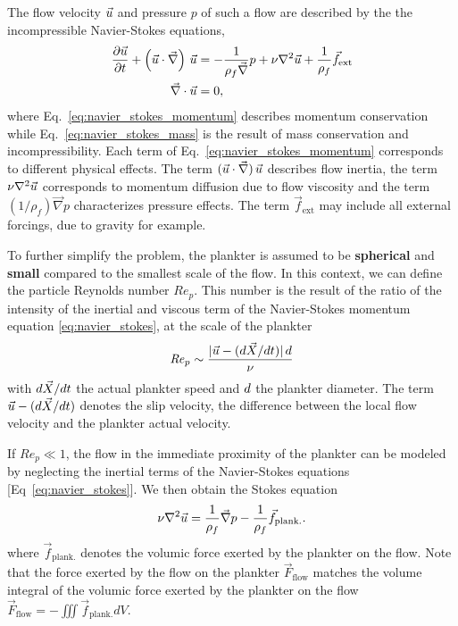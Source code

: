 The flow velocity $\vec{u}$ and pressure $p$ of such a flow are described by the the incompressible Navier-Stokes equations,
\begin{subequations}\label{eq:navier_stokes}
	\begin{align}
		\frac{\partial \vec{u}}{\partial t} + \left( \vec{u} \cdot \vec{\nabla} \right) \, \vec{u} & =
		- \frac{1}{\rho_f \vec{\nabla}} p + \nu \nabla^2 \vec{u} + \frac{1}{\rho_f} \vec{f}_{\mathrm{ext}}\label{eq:navier_stokes_momentum} \\
		\vec{\nabla} \cdot \vec{u} & = 0,\label{eq:navier_stokes_mass}
	\end{align}
\end{subequations}
where Eq.~\eqref{eq:navier_stokes_momentum} describes momentum conservation while Eq.~\eqref{eq:navier_stokes_mass} is the result of mass conservation and incompressibility.
Each term of Eq.~\eqref{eq:navier_stokes_momentum} corresponds to different physical effects. 
The term $( \vec{u} \cdot \vec{\nabla} ) \, \vec{u}$ describes flow inertia, the term $\nu \nabla^2 \vec{u}$ corresponds to momentum diffusion due to flow viscosity and the term $(1/\rho_f) \vec{\nabla} p$ characterizes pressure effects.
The term $\vec{f}_{\mathrm{ext}}$ may include all external forcings, due to gravity for example. %

To further simplify the problem, the plankter is assumed to be \textbf{spherical} and \textbf{small} compared to the smallest scale of the flow. %
In this context, we can define the particle Reynolds number $\mathit{Re}_{p}$.
This number is the result of the ratio of the intensity of the inertial and viscous term of the Navier-Stokes momentum equation \eqref{eq:navier_stokes}, at the scale of the plankter
\begin{equation}\label{eq:particle_reynolds_number}
	\mathit{Re}_p \sim \frac{\lvert\vec{u} - (d\vec{X}/dt)\rvert \, d}{\nu}
\end{equation}
with $d \vec{X} / dt$ the actual plankter speed and $d$ the plankter diameter.
The term $\vec{u} - (d\vec{X}/dt)$ denotes the slip velocity, the difference between the local flow velocity and the plankter actual velocity.

If $\mathit{Re}_p \ll 1$, the flow in the immediate proximity of the plankter can be modeled by neglecting the inertial terms of the Navier-Stokes equations [Eq~\eqref{eq:navier_stokes}].
We then obtain the Stokes equation
\begin{equation}\label{eq:stokes}
	\nu \nabla^2 \vec{u} = \frac{1}{\rho_f} \vec{\nabla} p - \frac{1}{\rho_f} \vec{f}_{\mathrm{plank.}}.
\end{equation}
where $\vec{f}_{\mathrm{plank.}}$ denotes the volumic force exerted by the plankter on the flow.
Note that the force exerted by the flow on the plankter $\vec{F}_{\mathrm{flow}}$ matches the volume integral of the volumic force exerted by the plankter on the flow $\vec{F}_{\mathrm{flow}} = -\iiint \vec{f}_{\mathrm{plank.}} dV$.

